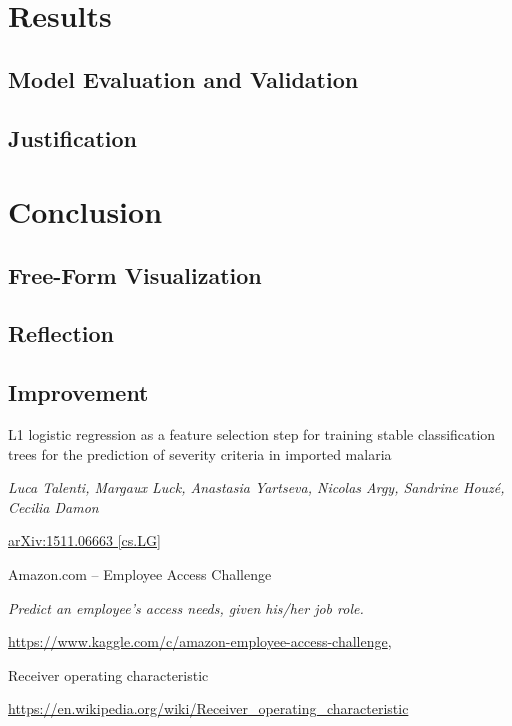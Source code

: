 \documentclass[11pt]{article}
\begin{document}
\section{Results}

\subsection{Model Evaluation and Validation}

\subsection{Justification}

\section{Conclusion}

\subsection{Free-Form Visualization}

\subsection{Reflection}

\subsection{Improvement}

\begin{thebibliography}{9}

    L1 logistic regression as a feature selection step for training stable 
    classification trees for the prediction of severity criteria in imported malaria

    \textit{Luca Talenti, Margaux Luck, Anastasia Yartseva, Nicolas Argy, Sandrine Houzé, Cecilia Damon}

    \href{https://arxiv.org/abs/1511.06663}{arXiv:1511.06663 [cs.LG]}

    Amazon.com -- Employee Access Challenge 

    \textit{Predict an employee's access needs, given his/her job role.}

    \href{https://www.kaggle.com/c/amazon-employee-access-challenge}
    {https://www.kaggle.com/c/amazon-employee-access-challenge},


    Receiver operating characteristic 

    \href{https://en.wikipedia.org/wiki/Receiver_operating_characteristic}
    {https://en.wikipedia.org/wiki/Receiver\_operating\_characteristic}

\end{thebibliography}
\end{document}
